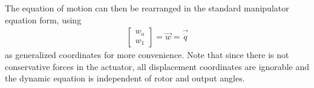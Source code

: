 %
The equation of motion can then be rearranged in the standard manipulator equation form, using
\begin{align}
\left[
\begin{array}{c}
w_o \\ w_1 
\end{array}
\right] = \vec{w} = \vec{\dot{q}} 
\end{align}
as generalized coordinates for more convenience. Note that since there is not conservative forces in the actuator, all displacement coordinates are ignorable and the dynamic equation is independent of rotor and output angles.
%
